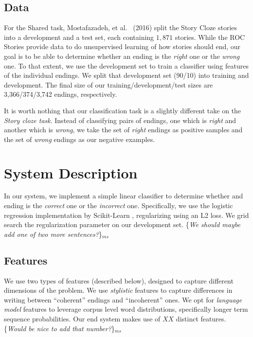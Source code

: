 \documentclass[11pt]{article}
\newcommand{\ms}[1]{{\color{cyan}\{\textit{#1}\}$_{ms}$}}
\begin{document}
\subsection{Data}
For the Shared task, Mostafazadeh, et al. ~(2016)\nocite{Mostafazadeh:2016} split the Story Cloze stories into a development and a test set, each containing $1,871$ stories.
While the ROC Stories provide data to do unsupervised learning of how stories should end, our goal is to be able to determine whether an ending is the \textit{right} one or the \textit{wrong} one. To that extent, we use the development set to train a classifier using features of the individual endings. We split that development set (90/10) into training and development.
The final size of our training/development/test sizes are 3,366/374/3,742 endings, respectively. 

It is worth nothing that our classification task is a slightly different take on the {\it Story cloze task}. 
Instead of classifying pairs of endings, one which is {\it right} and another which is {\it wrong}, we take the set of  {\it right} endings as positive samples and the set of {\it wrong} endings as our negative examples. 


\section{System Description}
In our system, we implement a simple linear classifier to determine whether and ending is the \textit{correct} one or the \textit{incorrect} one.
Specifically, we use the logistic regression implementation by Scikit-Learn \cite{scikit-learn}, regularizing using an L2 loss.
We grid search the regularization parameter on our development set. 
\ms{We should maybe add one of two more sentences?}

\subsection{Features}
We use two types of features (described below), designed to capture different dimensions of the problem. We use \textit{stylistic} features to capture differences in writing between ``coherent'' endings and ``incoherent'' ones. We opt for \textit{language model} features to leverage corpus level word distributions, specifically longer term sequence probabilities.
Our end system makes use of $XX$ distinct features. \ms{Would be nice to add that number?}
\end{document}
